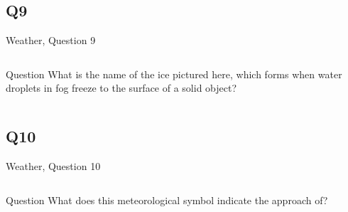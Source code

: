 \documentclass[11pt]{beamer}
\begin{document}
\subsection*{Q9}
\begin{frame}[t]{Weather, Question 9}
\begin{columns}[T,totalwidth=\linewidth]
\begin{column}{0.32\linewidth}
\begin{block}{Question}
What is the name of the ice pictured here, which forms when water droplets in fog freeze to the surface of a solid object?
\end{block}
\end{column}
\begin{column}{0.65\linewidth}
\begin{center}
\texttt{[image: \{Images/rime]}.jpg}
\end{center}
\end{column}
\end{columns}
\end{frame}
\subsection*{Q10}
\begin{frame}[t]{Weather, Question 10}
\begin{columns}[T,totalwidth=\linewidth]
\begin{column}{0.32\linewidth}
\begin{block}{Question}
What does this meteorological symbol indicate the approach of?
\end{block}
\end{column}
\begin{column}{0.65\linewidth}
\begin{center}
\texttt{[image: \{Images/coldfront]}.png}
\end{center}
\end{column}
\end{columns}
\end{frame}
\end{document}
